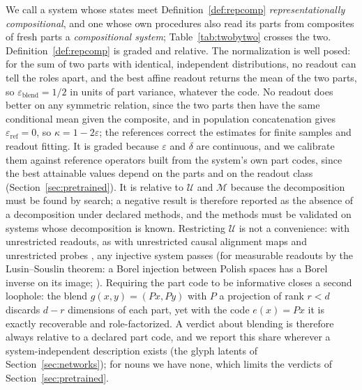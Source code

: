 \documentclass[10pt]{article}
\theoremstyle{plain}
\theoremstyle{remark}
\newcommand{\U}{\mathcal{U}}
\newcommand{\M}{\mathcal{M}}
\begin{document}
We call a system whose states meet Definition~\ref{def:repcomp} \emph{representationally compositional}, and one whose own procedures also read its parts from composites of fresh parts a \emph{compositional system}; Table~\ref{tab:twobytwo} crosses the two. Definition~\ref{def:repcomp} is graded and relative. The normalization is well posed: for the sum of two parts with identical, independent distributions, no readout can tell the roles apart, and the best affine readout returns the mean of the two parts, so $\varepsilon_{\mathrm{blend}} = 1/2$ in units of part variance, whatever the code. No readout does better on any symmetric relation, since the two parts then have the same conditional mean given the composite, and in population concatenation gives $\varepsilon_{\mathrm{ref}} = 0$, so $\kappa = 1 - 2\varepsilon$; the references correct the estimates for finite samples and readout fitting. It is graded because $\varepsilon$ and $\delta$ are continuous, and we calibrate them against reference operators built from the system's own part codes, since the best attainable values depend on the parts and on the readout class (Section~\ref{sec:pretrained}). It is relative to $\U$ and $\M$ because the decomposition must be found by search; a negative result is therefore reported as the absence of a decomposition under declared methods, and the methods must be validated on systems whose decomposition is known. Restricting $\U$ is not a convenience: with unrestricted readouts, as with unrestricted causal alignment maps \citep{sutter2025} and unrestricted probes \citep{hewitt2019}, any injective system passes (for measurable readouts by the Lusin--Souslin theorem: a Borel injection between Polish spaces has a Borel inverse on its image; \citealt[Theorem~15.1]{kechris1995}). Requiring the part code to be informative closes a second loophole: the blend $g(x, y) = (Px, Py)$ with $P$ a projection of rank $r < d$ discards $d - r$ dimensions of each part, yet with the code $e(x) = Px$ it is exactly recoverable and role-factorized. A verdict about blending is therefore always relative to a declared part code, and we report this share wherever a system-independent description exists (the glyph latents of Section~\ref{sec:networks}); for nouns we have none, which limits the verdicts of Section~\ref{sec:pretrained}.
\end{document}
